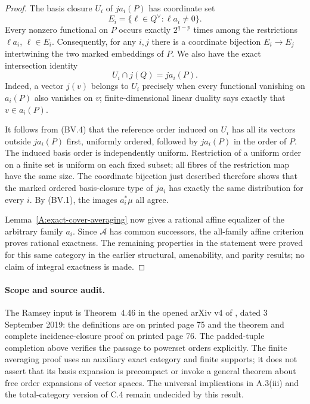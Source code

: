 \begin{proof}
The basis closure $U_i$ of $ja_i(P)$ has coordinate set
\[
 E_i=\{\ell\in Q^\vee:\ell a_i\ne0\}.
\]
Every nonzero functional on $P$ occurs exactly $2^{q-p}$ times
among the restrictions $\ell a_i$, $\ell\in E_i$.  Consequently,
for any $i,j$ there is a coordinate bijection $E_i\to E_j$
intertwining the two marked embeddings of $P$.
We also have the exact intersection identity
\[
 U_i\cap j(Q)=ja_i(P).
 \tag{BV.4}
\]
Indeed, a vector $j(v)$ belongs to $U_i$ precisely when every
functional vanishing on $a_i(P)$ also vanishes on $v$; finite-dimensional
linear duality says exactly that $v\in a_i(P)$.

It follows from (BV.4) that the reference order induced on $U_i$
has all its vectors outside $ja_i(P)$ first, uniformly ordered,
followed by $ja_i(P)$ in the order of $P$.  The induced basis order
is independently uniform.  Restriction of a uniform order on a finite
set is uniform on each fixed subset; all fibres of the restriction
map have the same size.  The coordinate bijection just described
therefore shows that the marked ordered basis-closure type of $ja_i$
has exactly the same distribution for every $i$.  By (BV.1),
the images $a_i^*\mu$ all agree.

Lemma~\ref{A:exact-cover-averaging} now gives a rational affine
equalizer of the arbitrary family $a_i$.  Since $\mathcal A$ has
common successors, the all-family affine criterion proves rational
exactness.  The remaining properties in the statement were proved
for this same category in the earlier structural, amenability, and
parity results; no claim of integral exactness is made.
\end{proof}

\paragraph{Scope and source audit.}
The Ramsey input is Theorem~4.46 in the opened arXiv v4 of
\cite{DHubickaNesetril2019}, dated 3 September 2019:
the definitions are on printed page 75 and the theorem and complete
incidence-closure proof on printed page 76.  The padded-tuple
completion above verifies the passage to powerset orders explicitly.
The finite averaging proof uses an auxiliary exact category and
finite supports; it does not assert that its basis expansion is
precompact or invoke a general theorem about free order expansions
of vector spaces.  The universal implications in A.3(iii) and the
total-category version of C.4 remain undecided by this result.
